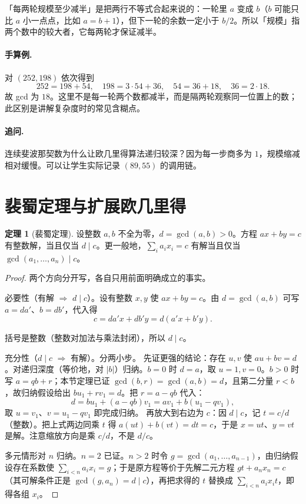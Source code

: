 \documentclass[UTF8,a4paper,11pt,twoside,openright,fontset=fandol]{ctexbook}
\theoremstyle{definition}
\newtheorem{theorem}[definition]{定理}
\begin{document}
\begin{tip}[口径：「每两轮规模至少减半」]
「每两轮规模至少减半」是把两行不等式合起来说的：一轮里 $a$ 变成 $b$（$b$ 可能只比 $a$ 小一点点，比如 $a=b+1$），但下一轮的余数一定小于 $b/2$。所以「规模」指两个数中的较大者，它每两轮才保证减半。
\end{tip}



\paragraph{手算例.} 对 $(252,198)$ 依次得到
\[
252=198+54,\quad198=3\cdot54+36,\quad54=36+18,\quad36=2\cdot18.
\]
故 gcd 为 $18$。这里不是每一轮两个数都减半，而是隔两轮观察同一位置上的数；此区别是讲解复杂度时的常见含糊点。
\paragraph{追问.} 连续斐波那契数为什么让欧几里得算法递归较深？因为每一步商多为 $1$，规模缩减相对缓慢。可以让学生实际记录 $(89,55)$ 的调用链。


\section{裴蜀定理与扩展欧几里得}
\begin{theorem}[裴蜀定理]
设整数 $a,b$ 不全为零，$d=\gcd(a,b)>0$。方程 $ax+by=c$ 有整数解，当且仅当 $d\mid c$。更一般地，$\sum_i a_ix_i=c$ 有解当且仅当 $\gcd(a_1,\ldots,a_n)\mid c$。
\end{theorem}
\begin{proof}
两个方向分开写，各自只用前面明确成立的事实。

必要性（有解 $\Rightarrow$ $d\mid c$）。设有整数 $x,y$ 使 $ax+by=c$。由 $d=\gcd(a,b)$ 可写 $a=da'$、$b=db'$，代入得
\[
 c=da'x+db'y=d(a'x+b'y).
\]


括号是整数（整数对加法与乘法封闭），所以 $d\mid c$。

充分性（$d\mid c$ $\Rightarrow$ 有解）。分两小步。
先证更强的结论：存在 $u,v$ 使 $au+bv=d$。对递归深度（等价地，对 $|b|$）归纳。$b=0$ 时 $d=a$，取 $u=1,v=0$。$b>0$ 时写 $a=qb+r$；本节定理已证 $\gcd(b,r)=\gcd(a,b)=d$，且第二分量 $r<b$，故归纳假设给出 $bu_1+rv_1=d$。把 $r=a-qb$ 代入：
\[
 d=bu_1+(a-qb)v_1=av_1+b(u_1-qv_1),
\]
取 $u=v_1$、$v=u_1-qv_1$ 即完成归纳。
再放大到右边为 $c$：因 $d\mid c$，记 $t=c/d$（整数）。把上式两边同乘 $t$ 得 $a(ut)+b(vt)=dt=c$，于是 $x=ut$、$y=vt$ 是解。注意缩放方向是乘 $c/d$，不是 $d/c$。

多元情形对 $n$ 归纳。$n=2$ 已证。$n>2$ 时令 $g=\gcd(a_1,\ldots,a_{n-1})$，由归纳假设存在系数使 $\sum_{i<n}a_ix_i=g$；于是原方程等价于先解二元方程 $gt+a_nx_n=c$（其可解条件正是 $\gcd(g,a_n)=d\mid c$），再把求得的 $t$ 替换成 $\sum_{i<n}a_ix_it$，即得各组 $x_i$。
\end{proof}
\end{document}
